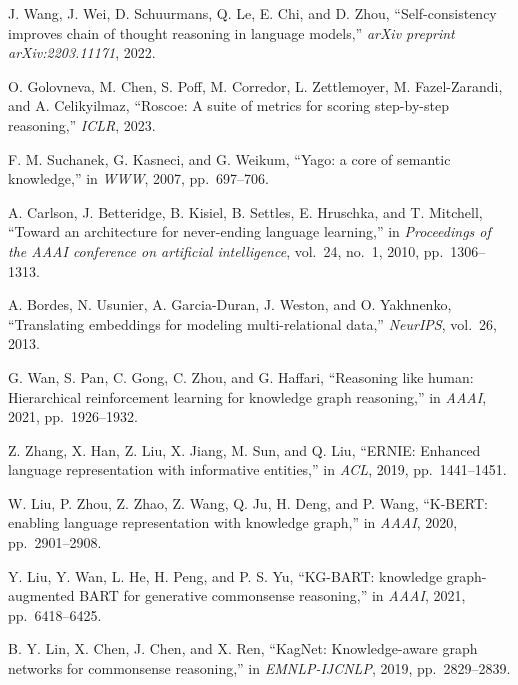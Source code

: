 \begin{enumerate}[leftmargin=2em,label={[\arabic*]}]
\item J. Wang, J. Wei, D. Schuurmans, Q. Le, E. Chi, and D. Zhou, ``Self-consistency improves chain of thought reasoning in language models,'' \textit{arXiv preprint arXiv:2203.11171}, 2022.

\item O. Golovneva, M. Chen, S. Poff, M. Corredor, L. Zettlemoyer, M. Fazel-Zarandi, and A. Celikyilmaz, ``Roscoe: A suite of metrics for scoring step-by-step reasoning,'' \textit{ICLR}, 2023.

\item F. M. Suchanek, G. Kasneci, and G. Weikum, ``Yago: a core of semantic knowledge,'' in \textit{WWW}, 2007, pp.~697--706.

\item A. Carlson, J. Betteridge, B. Kisiel, B. Settles, E. Hruschka, and T. Mitchell, ``Toward an architecture for never-ending language learning,'' in \textit{Proceedings of the AAAI conference on artificial intelligence}, vol.~24, no.~1, 2010, pp.~1306--1313.

\item A. Bordes, N. Usunier, A. Garcia-Duran, J. Weston, and O. Yakhnenko, ``Translating embeddings for modeling multi-relational data,'' \textit{NeurIPS}, vol.~26, 2013.

\item G. Wan, S. Pan, C. Gong, C. Zhou, and G. Haffari, ``Reasoning like human: Hierarchical reinforcement learning for knowledge graph reasoning,'' in \textit{AAAI}, 2021, pp.~1926--1932.

\item Z. Zhang, X. Han, Z. Liu, X. Jiang, M. Sun, and Q. Liu, ``ERNIE: Enhanced language representation with informative entities,'' in \textit{ACL}, 2019, pp.~1441--1451.

\item W. Liu, P. Zhou, Z. Zhao, Z. Wang, Q. Ju, H. Deng, and P. Wang, ``K-BERT: enabling language representation with knowledge graph,'' in \textit{AAAI}, 2020, pp.~2901--2908.

\item Y. Liu, Y. Wan, L. He, H. Peng, and P. S. Yu, ``KG-BART: knowledge graph-augmented BART for generative commonsense reasoning,'' in \textit{AAAI}, 2021, pp.~6418--6425.

\item B. Y. Lin, X. Chen, J. Chen, and X. Ren, ``KagNet: Knowledge-aware graph networks for commonsense reasoning,'' in \textit{EMNLP-IJCNLP}, 2019, pp.~2829--2839.


\end{enumerate}
